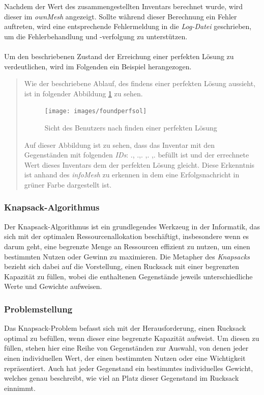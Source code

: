 Nachdem der Wert des zusammengestellten Inventars berechnet wurde, wird dieser im \textit{ownMesh} angezeigt. Sollte während
dieser Berechnung ein Fehler auftreten, wird eine entsprechende Fehlermeldung in die \textit{Log-Datei} geschrieben, um
die Fehlerbehandlung und -verfolgung zu unterstützen.\\
\\
Um den beschriebenen Zustand der Erreichung einer perfekten Lösung zu verdeutlichen, wird im Folgenden ein Beispiel herangezogen.

\begin{quote}
Wie der beschriebene Ablauf, des findens einer perfekten Lösung aussieht, ist in folgender Abbildung \ref{fig:foundperfsol}
zu sehen.
\begin{figure}[H]
\centering
\texttt{[image: images/foundperfsol]}
\caption{Sicht des Benutzers nach finden einer perfekten Lösung}
\label{fig:foundperfsol}
\end{figure}

Auf dieser Abbildung ist zu sehen, dass das Inventar mit den Gegenständen mit folgenden \textit{IDs}: ., .,. ,. ,. befüllt
ist und der errechnete Wert dieses Inventars dem der perfekten Lösung gleicht. Diese Erkenntnis ist anhand des \textit{infoMesh}
zu erkennen in dem eine Erfolgsnachricht in grüner Farbe dargestellt ist.
\end{quote}

\subsubsection{Knapsack-Algorithmus}
Der Knapsack-Algorithmus ist ein grundlegendes Werkzeug in der Informatik, das sich mit der optimalen Ressourcenallokation
beschäftigt, insbesondere wenn es darum geht, eine begrenzte Menge an Ressourcen effizient zu nutzen, um einen bestimmten
Nutzen oder Gewinn zu maximieren. Die Metapher des \textit{Knapsacks} bezieht sich dabei auf die Vorstellung, einen Rucksack
mit einer begrenzten Kapazität zu füllen, wobei die enthaltenen Gegenstände jeweils unterschiedliche Werte und Gewichte aufweisen.

\subsubsection{Problemstellung}
Das Knapsack-Problem befasst sich mit der Herausforderung, einen Rucksack optimal zu befüllen, wenn dieser eine begrenzte
Kapazität aufweist. Um diesen zu füllen, stehen hier eine Reihe von Gegenständen zur Auswahl, von denen jeder einen
individuellen Wert, der einen bestimmten Nutzen oder eine Wichtigkeit repräsentiert. Auch hat jeder Gegenstand ein
bestimmtes individuelles Gewicht, welches genau beschreibt, wie viel an Platz dieser Gegenstand im Rucksack einnimmt.

